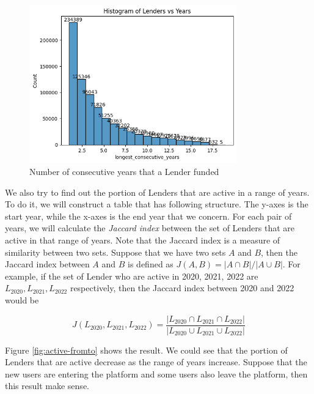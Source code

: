 \begin{figure}[H]
	\centering
	\includegraphics[width=0.8\textwidth]{images/active-hist.png}
	\caption{Number of consecutive years that a Lender funded}
	\label{fig:active-hist}
\end{figure}

We also try to find out the portion of Lenders that are active in a range of years.
To do it, we will construct a table that has following structure.
The y-axes is the start year,
while the x-axes is the end year that we concern.
For each pair of years, we will calculate the \textit{Jaccard index}
between the set of Lenders that are active in that range of years.
Note that the Jaccard index is a measure of similarity between two sets.
Suppose that we have two sets $A$ and $B$,
then the Jaccard index between $A$ and $B$ is defined as
$J(A, B) = |A \cap B|/|A \cup B|$.
For example, if the set of Lender who are active in 2020, 2021, 2022 are
$L_{2020}, L_{2021}, L_{2022}$ respectively,
then the Jaccard index between 2020 and 2022 would be

\begin{equation}
	J(L_{2020}, L_{2021}, L_{2022}) = \frac{|L_{2020} \cap L_{2021} \cap L_{2022}|}{|L_{2020} \cup L_{2021} \cup L_{2022}|}
\end{equation}


Figure \ref{fig:active-fromto} shows the result.
We could see that the portion of Lenders that are active decrease as the range of years increase.
Suppose that the new users are entering the platform and some users also leave the platform,
then this result make sense.


